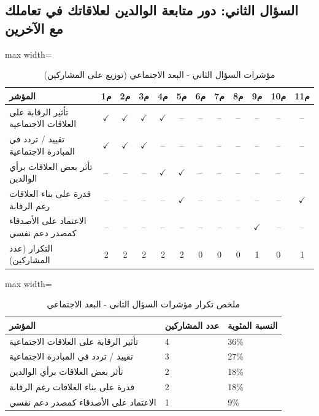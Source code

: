 \documentclass[12pt,oneside]{report}
\begin{document}
\subsection{السؤال الثاني: دور متابعة الوالدين لعلاقاتك في تعاملك مع الآخرين}
\begin{table}[H]
\centering
\caption{مؤشرات السؤال الثاني - البعد الاجتماعي (توزيع على المشاركين)}
\scriptsize
\renewcommand{\arraystretch}{1.3}
\setlength{\tabcolsep}{4pt}
\begin{adjustbox}{max width=\textwidth}
\begin{tabular}{l c c c c c c c c c c c}
\toprule
\textbf{المؤشر} & \textbf{م1} & \textbf{م2} & \textbf{م3} & \textbf{م4} & \textbf{م5} & \textbf{م6} & \textbf{م7} & \textbf{م8} & \textbf{م9} & \textbf{م10} & \textbf{م11} \\
\midrule
تأثير الرقابة على العلاقات الاجتماعية & $\checkmark$ & $\checkmark$ & $\checkmark$ & $\checkmark$ & -- & -- & -- & -- & -- & -- & -- \\
تقييد / تردد في المبادرة الاجتماعية & $\checkmark$ & $\checkmark$ & $\checkmark$ & -- & -- & -- & -- & -- & -- & -- & -- \\
تأثر بعض العلاقات برأي الوالدين & -- & -- & -- & $\checkmark$ & $\checkmark$ & -- & -- & -- & -- & -- & -- \\
قدرة على بناء العلاقات رغم الرقابة & -- & -- & -- & -- & $\checkmark$ & -- & -- & -- & -- & -- & $\checkmark$ \\
الاعتماد على الأصدقاء كمصدر دعم نفسي & -- & -- & -- & -- & -- & -- & -- & -- & $\checkmark$ & -- & -- \\
التكرار (عدد المشاركين) & 2 & 2 & 2 & 2 & 2 & 0 & 0 & 0 & 1 & 0 & 1 \\
\bottomrule
\end{tabular}
\end{adjustbox}
\end{table}
\begin{table}[H]
\centering
\caption{ملخص تكرار مؤشرات السؤال الثاني - البعد الاجتماعي}
\small
\renewcommand{\arraystretch}{1.3}
\setlength{\tabcolsep}{4pt}
\begin{adjustbox}{max width=\textwidth}
\begin{tabular}{p{6cm} p{4cm} p{4cm}}
\toprule
\textbf{المؤشر} & \textbf{عدد المشاركين} & \textbf{النسبة المئوية} \\
\midrule
تأثير الرقابة على العلاقات الاجتماعية & 4 & 36\% \\
تقييد / تردد في المبادرة الاجتماعية & 3 & 27\% \\
تأثر بعض العلاقات برأي الوالدين & 2 & 18\% \\
قدرة على بناء العلاقات رغم الرقابة & 2 & 18\% \\
الاعتماد على الأصدقاء كمصدر دعم نفسي & 1 & 9\% \\
\bottomrule
\end{tabular}
\end{adjustbox}
\end{table}
\end{document}
